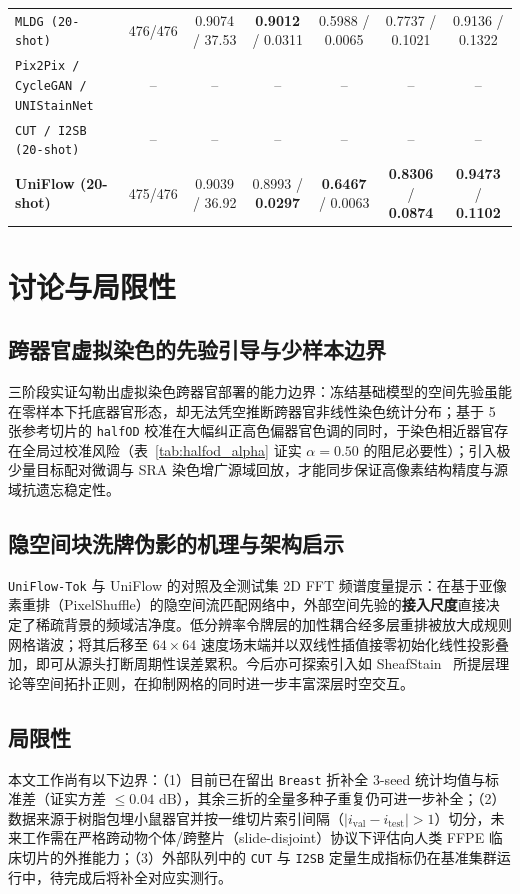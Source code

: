 \documentclass[journal]{IEEEtran}
\newcommand{\methodname}{UniFlow}
\begin{document}
\begin{table}[!t]
{\begin{tabular}{lcccccc}
\texttt{MLDG (20-shot)} & 476/476 & 0.9074 / 37.53 & \textbf{0.9012} / 0.0311 & 0.5988 / 0.0065 & 0.7737 / 0.1021 & 0.9136 / 0.1322 \\
\texttt{Pix2Pix / CycleGAN / UNIStainNet} & -- & -- & -- & -- & -- & -- \\
\texttt{CUT / I2SB (20-shot)} & -- & -- & -- & -- & -- & -- \\
\textbf{\methodname{} (20-shot)} & 475/476 & 0.9039 / 36.92 & 0.8993 / \textbf{0.0297} & \textbf{0.6467} / 0.0063 & \textbf{0.8306} / \textbf{0.0874} & \textbf{0.9473} / \textbf{0.1102} \\
\bottomrule
\end{tabular}}
\end{table}

\section{讨论与局限性}
\subsection{跨器官虚拟染色的先验引导与少样本边界}
三阶段实证勾勒出虚拟染色跨器官部署的能力边界：冻结基础模型的空间先验虽能在零样本下托底器官形态，却无法凭空推断跨器官非线性染色统计分布；基于 5 张参考切片的 \texttt{halfOD} 校准在大幅纠正高色偏器官色调的同时，于染色相近器官存在全局过校准风险（表~\ref{tab:halfod_alpha} 证实 $\alpha=0.50$ 的阻尼必要性）；引入极少量目标配对微调与 SRA 染色增广源域回放，才能同步保证高像素结构精度与源域抗遗忘稳定性。

\subsection{隐空间块洗牌伪影的机理与架构启示}
\texttt{UniFlow-Tok} 与 \methodname{} 的对照及全测试集 2D FFT 频谱度量提示：在基于亚像素重排（PixelShuffle）的隐空间流匹配网络中，外部空间先验的\textbf{接入尺度}直接决定了稀疏背景的频域洁净度。低分辨率令牌层的加性耦合经多层重排被放大成规则网格谐波；将其后移至 $64\times 64$ 速度场末端并以双线性插值接零初始化线性投影叠加，即可从源头打断周期性误差累积。今后亦可探索引入如 SheafStain~\cite{ref_sheafstain} 所提层理论等空间拓扑正则，在抑制网格的同时进一步丰富深层时空交互。

\subsection{局限性}
本文工作尚有以下边界：（1）目前已在留出 \texttt{Breast} 折补全 3-seed 统计均值与标准差（证实方差 $\le 0.04\text{ dB}$），其余三折的全量多种子重复仍可进一步补全；（2）数据来源于树脂包埋小鼠器官并按一维切片索引间隔（$|i_{\text{val}} - i_{\text{test}}| > 1$）切分，未来工作需在严格跨动物个体/跨整片（slide-disjoint）协议下评估向人类 FFPE 临床切片的外推能力；（3）外部队列中的 \texttt{CUT} 与 \texttt{I2SB} 定量生成指标仍在基准集群运行中，待完成后将补全对应实测行。
\end{document}
